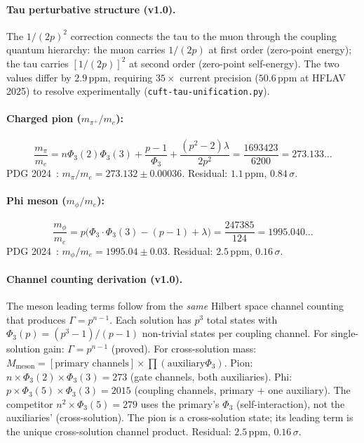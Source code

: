 \documentclass[12pt,a4paper]{article}
\theoremstyle{definition}
\newcommand{\Phithree}{\Phi_3}
\newcommand{\ppm}{\,\mathrm{ppm}}
\begin{document}
\paragraph{Tau perturbative structure (v1.0).}
The $1/(2p)^2$ correction connects the tau to the muon through
the coupling quantum hierarchy: the muon carries $1/(2p)$ at first
order (zero-point energy); the tau carries $[1/(2p)]^2$ at second
order (zero-point self-energy). The two values differ by $2.9\ppm$,
requiring $35\times$ current precision ($50.6\ppm$ at HFLAV 2025) to
resolve experimentally (\texttt{cuft-tau-unification.py}).

\paragraph{Charged pion ($m_{\pi^+}/m_e$):}
\begin{equation}\label{eq:pion}
  \frac{m_\pi}{m_e} = n\Phithree(2)\Phithree(3) + \frac{p-1}{\Phithree}
  + \frac{(p^2 - 2)\lambda}{2p^2}
  = \frac{1693423}{6200} = 273.133\ldots
\end{equation}
PDG 2024~\cite{pdg2024}: $m_\pi/m_e = 273.132 \pm 0.00036$.
Residual: $1.1\ppm$, $0.84\,\sigma$.

\paragraph{Phi meson ($m_\phi/m_e$):}
\begin{equation}\label{eq:phi-meson}
  \frac{m_\phi}{m_e} = p\bigl(\Phithree \cdot \Phithree(3) - (p-1) + \lambda\bigr)
  = \frac{247385}{124} = 1995.040\ldots
\end{equation}
PDG 2024~\cite{pdg2024}: $m_\phi/m_e = 1995.04 \pm 0.03$.
Residual: $2.5\ppm$, $0.16\,\sigma$.

\paragraph{Channel counting derivation (v1.0).}
The meson leading terms follow from the \emph{same} Hilbert space channel
counting that produces $\Gamma = p^{n-1}$.
Each solution has $p^3$ total states with $\Phithree(p) = (p^3{-}1)/(p{-}1)$
non-trivial states per coupling channel. For single-solution gain:
$\Gamma = p^{n-1}$ (proved). For cross-solution mass:
$M_\mathrm{meson} = [\text{primary channels}] \times \prod(\text{auxiliary
}\Phithree)$.  Pion: $n \times \Phithree(2) \times \Phithree(3) = 273$
(gate channels, both auxiliaries). Phi: $p \times \Phithree(5) \times
\Phithree(3) = 2015$ (coupling channels, primary $+$ one auxiliary).
The competitor $n^2 \times \Phithree(5) = 279$ uses the primary's
$\Phithree$ (self-interaction), not the auxiliaries' (cross-solution).
The pion is a cross-solution state; its leading term is the unique
cross-solution channel product.
Residual: $2.5\ppm$, $0.16\,\sigma$.
\end{document}
